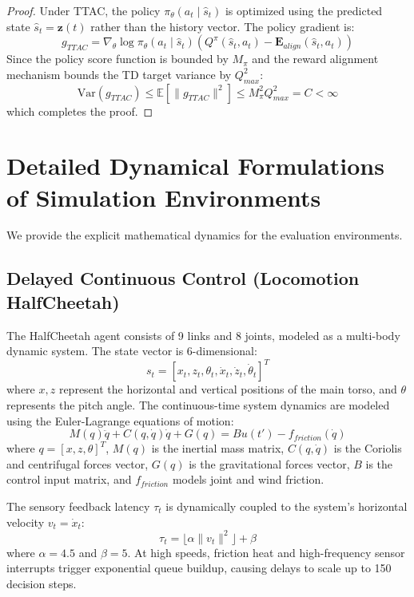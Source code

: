 \documentclass[manuscript, screen, review]{jair}
\begin{document}
\begin{proof}
Under TTAC, the policy $\pi_\theta(a_t \mid \hat{s}_t)$ is optimized using the predicted state $\hat{s}_t = \mathbf{z}(t)$ rather than the history vector. The policy gradient is:
\begin{equation*}
    g_{TTAC} = \nabla_\theta \log \pi_\theta(a_t \mid \hat{s}_t) \left( Q^{\pi}(\hat{s}_t, a_t) - \mathbf{E}_{align}(\hat{s}_t, a_t) \right)
\end{equation*}
Since the policy score function is bounded by $M_\pi$ and the reward alignment mechanism bounds the TD target variance by $Q_{max}^2$:
\begin{equation*}
    \text{Var}(g_{TTAC}) \le \mathbb{E}[\|g_{TTAC}\|^2] \le M_\pi^2 Q_{max}^2 = C < \infty
\end{equation*}
which completes the proof.
\end{proof}

\section{Detailed Dynamical Formulations of Simulation Environments}\label{app:sec_environments}
We provide the explicit mathematical dynamics for the evaluation environments.

\subsection{Delayed Continuous Control (Locomotion HalfCheetah)}\label{app:sub_halfcheetah}
The HalfCheetah agent consists of 9 links and 8 joints, modeled as a multi-body dynamic system. The state vector is 6-dimensional:
\begin{equation}
    s_t = [x_t, z_t, \theta_t, \dot{x}_t, \dot{z}_t, \dot{\theta}_t]^T
\end{equation}
where $x, z$ represent the horizontal and vertical positions of the main torso, and $\theta$ represents the pitch angle. The continuous-time system dynamics are modeled using the Euler-Lagrange equations of motion:
\begin{equation}
    M(q) \ddot{q} + C(q, \dot{q}) \dot{q} + G(q) = B u(t') - f_{friction}(\dot{q})
\end{equation}
where $q = [x, z, \theta]^T$, $M(q)$ is the inertial mass matrix, $C(q, \dot{q})$ is the Coriolis and centrifugal forces vector, $G(q)$ is the gravitational forces vector, $B$ is the control input matrix, and $f_{friction}$ models joint and wind friction.

The sensory feedback latency $\tau_t$ is dynamically coupled to the system's horizontal velocity $v_t = \dot{x}_t$:
\begin{equation}
    \tau_t = \lfloor \alpha \|v_t\|^2 \rfloor + \beta
\end{equation}
where $\alpha = 4.5$ and $\beta = 5$. At high speeds, friction heat and high-frequency sensor interrupts trigger exponential queue buildup, causing delays to scale up to 150 decision steps.
\end{document}
